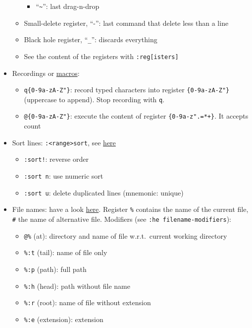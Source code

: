 \documentclass[a4paper,12pt,%
              final%
              ]{article}
\begin{document}
\begin{itemize}
\begin{itemize}
\begin{itemize}
          \item ``\verb|~|'': last drag-n-drop
        \end{itemize}
      \item Small-delete register, ``-'': last command that delete less than a line
      \item Black hole register, ``\verb|_|'': discards everything
      \item See the content of the registers with \verb|:reg[isters]|
    \end{itemize}
  \item Recordings or
    \href{https://vim.fandom.com/wiki/Macros#Viewing_a_macro}{macros}:
    \begin{itemize}
      \item \verb|q{0-9a-zA-Z"}|: record typed characters into register
        \verb|{0-9a-zA-Z"}| (uppercase to append). Stop recording with \verb|q|.
      \item \verb|@{0-9a-zA-Z"}|: execute the content of register
        \verb|{0-9a-z".=*+}|. It accepts count
    \end{itemize}
  \item Sort lines: \verb|:<range>sort|, see \href{https://vim.fandom.com/wiki/Sort_lines}{here}
    \begin{itemize}
      \item \verb|:sort!|: reverse order
      \item \verb|:sort n|: use numeric sort
      \item \verb|:sort u|: delete duplicated lines (mnemonic: unique)
    \end{itemize}
  \item File names: have a look \href{https://vim.fandom.com/wiki/Get_the_name_of_the_current_file}{here}.
    Register \verb|%| contains the name of the current file, \verb|#| the name of alternative file.
    Modifiers (see \verb|:he filename-modifiers|):
    \begin{itemize}
      \item \verb|@%| (at): directory and name of file w.r.t.~current working directory
      \item \verb|%:t| (tail): name of file only
      \item \verb|%:p| (path): full path
      \item \verb|%:h| (head): path without file name
      \item \verb|%:r| (root): name of file without extension
      \item \verb|%:e| (extension): extension

\end{itemize}
\end{itemize}
\end{document}
